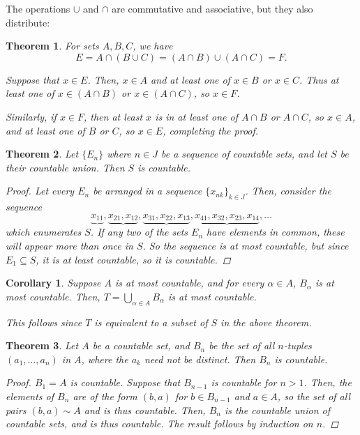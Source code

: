 \documentclass{scrbook}
\newtheorem{theorem}{Theorem}
\newtheorem{corollary}{Corollary}
\begin{document}
The operations $\cup$ and $\cap$ are commutative and associative, but they also distribute:

\begin{theorem}
For sets $A, B, C$, we have
\[
	E = A \cap (B \cup C) = (A \cap B) \cup (A \cap C) = F.
\]

Suppose that $x \in E$. Then, $x \in A$ and at least one of $x \in B$ or $x \in C$. Thus at least one of $x \in (A \cap B)$ or $x \in (A \cap C)$, so $x \in F$.

Similarly, if $x \in F$, then at least $x$ is in at least one of $A \cap B$ or $A \cap C$, so $x \in A$, and at least one of $B$ or $C$, so $x \in E$, completing the proof.
\end{theorem}

\begin{theorem}
Let $\{E_n\}$ where $n \in J$ be a sequence of countable sets, and let $S$ be their countable union. Then $S$ is countable.

\begin{proof}
Let every $E_n$ be arranged in a sequence $\{x_{nk}\}_{k \in J}$. Then, consider the sequence
\[
	\underbrace{x_{11}}, \underbrace{x_{21}, x_{12}}, \underbrace{x_{31}, x_{22}, x_{13}}, \underbrace{x_{41}, x_{32}, x_{23}, x_{14}}, \dotsc
\]
which enumerates $S$. If any two of the sets $E_n$ have elements in common, these will appear more than once in $S$. So the sequence is at most countable, but since $E_1 \subseteq S$, it is at least countable, so it is countable.
\end{proof}
\end{theorem}

\begin{corollary}
Suppose $A$ is at most countable, and for every $\alpha \in A$, $B_\alpha$ is at most countable. Then, $T = \bigcup_{\alpha \in A} B_\alpha$ is at most countable.

This follows since $T$ is equivalent to a subset of $S$ in the above theorem.
\end{corollary}

\begin{theorem}
Let $A$ be a countable set, and $B_n$ be the set of all $n$-tuples $(a_1, \dotsc, a_n)$ in $A$, where the $a_k$ need not be distinct. Then $B_n$ is countable.

\begin{proof}
$B_1 = A$ is countable. Suppose that $B_{n-1}$ is countable for $n > 1$. Then, the elements of $B_n$ are of the form $(b, a)$ for $b \in B_{n-1}$ and $a \in A$, so the set of all pairs $(b, a) \sim A$ and is thus countable. Then, $B_n$ is the countable union of countable sets, and is thus countable. The result follows by induction on $n$.
\end{proof}
\end{theorem}
\end{document}
